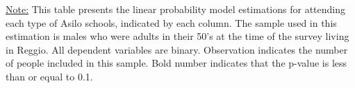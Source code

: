 \begin{table}[H]
\caption{LPM Estimation - Reggio - Adults (Age 50) - Male, Asilo}
\centering
{}
\end{table}
\begin{footnotesize}
\noindent\underline{Note:} This table presents the linear probability model estimations for attending each type of Asilo schools, indicated by each column. The sample used in this estimation is males who were adults in their 50's at the time of the survey living in Reggio. All dependent variables are binary. Observation indicates the number of people included in this sample. Bold number indicates that the p-value is less than or equal to 0.1.
\end{footnotesize}
